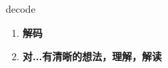 
\begin{frame}
{\huge decode}
\begin{center}
\begin{enumerate}\Large
  \item \textbf{解码}
  \item \textbf{对...有清晰的想法，理解，解读}
\end{enumerate}
\end{center}
\end{frame}
